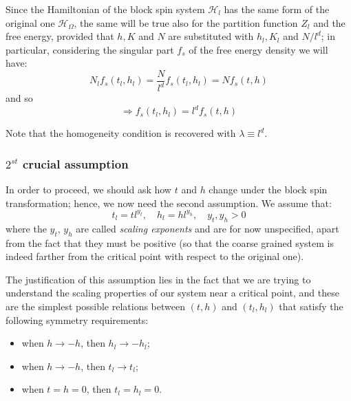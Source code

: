 \documentclass[../../Main/Main.tex]{subfiles}
\begin{document}
Since the Hamiltonian of the block spin system \( \mathcal{H}_l \) has the same form of the original one \( \mathcal{H}_ \Omega  \), the same will be true also for the partition function \( Z_l \) and the free energy, provided that \( h,K \) and \( N \) are substituted with \( h_l,K_l \) and \( N/l^d \); in particular, considering the singular part \( f_s \) of the free energy density we will have:
\begin{equation*}
  N_l f_s (t_l,h_l)= \frac{N}{l^d} f_s (t_l,h_l) = N f_s (t,h)
\end{equation*}
and so
\begin{equation*}
  \Rightarrow  f_s (t_l,h_l) = l^d f_s (t,h)
\end{equation*}

\begin{remark}
Note that the homogeneity condition is recovered with \( \lambda \equiv l^d \).
\end{remark}


\subsubsection{\(  2^{st} \) crucial assumption}
In order to proceed, we should ask how \( t \) and \( h \) change under the block spin transformation; hence, we now need the second assumption. We assume that:
\begin{equation}
   t_l = t l^{y_t}, \quad   h_l = h l^{y_h}, \quad y_t,y_h >0
  \label{eq:19_8}
\end{equation}
where the \( y_t, \, y_h \) are called \emph{scaling exponents} and are for now unspecified, apart from the fact that they must be positive (so that the coarse grained system is indeed farther from the critical point with respect to the original one).

The justification of this assumption lies in the fact that we are trying to understand the scaling properties of our system near a critical point, and these are the simplest possible relations between \( (t,h) \) and \( (t_l,h_l) \) that satisfy the following symmetry requirements:
\begin{itemize}
\item when \( h \rightarrow -h \), then \( h_l \rightarrow -h_l \);
\item when \( h \rightarrow -h \), then \( t_l \rightarrow t_l \);
\item when \( t=h=0 \), then \( t_l=h_l=0 \).
\end{itemize}
\end{document}
